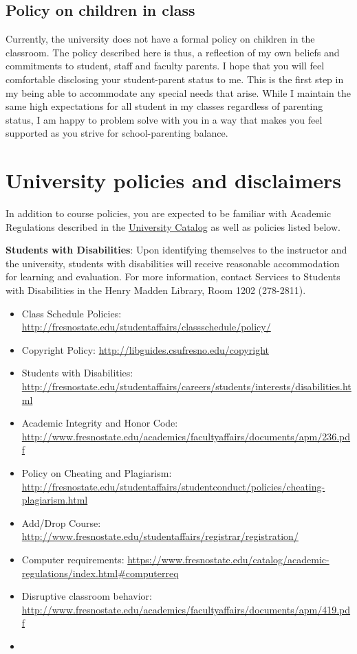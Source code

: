 \hypertarget{policy-on-children-in-class}{%
\subsection{Policy on children in
class}\label{policy-on-children-in-class}}

Currently, the university does not have a formal policy on children in
the classroom. The policy described here is thus, a reflection of my own
beliefs and commitments to student, staff and faculty parents. I hope
that you will feel comfortable disclosing your student-parent status to
me. This is the first step in my being able to accommodate any special
needs that arise. While I maintain the same high expectations for all
student in my classes regardless of parenting status, I am happy to
problem solve with you in a way that makes you feel supported as you
strive for school-parenting balance.

\hypertarget{university-policies-and-disclaimers}{%
\section{University policies and
disclaimers}\label{university-policies-and-disclaimers}}

In addition to course policies, you are expected to be familiar with
Academic Regulations described in the
\href{http://www.fresnostate.edu/catalog/academic-regulations/}{University
Catalog} as well as policies listed below.

\textbf{Students with Disabilities}: Upon identifying themselves to the
instructor and the university, students with disabilities will receive
reasonable accommodation for learning and evaluation. For more
information, contact Services to Students with Disabilities in the Henry
Madden Library, Room 1202 (278-2811).

\begin{itemize}
\item
  Class Schedule Policies:
  \url{http://fresnostate.edu/studentaffairs/classschedule/policy/}
\item
  Copyright Policy: \url{http://libguides.csufresno.edu/copyright}
\item
  Students with Disabilities:
  \url{http://fresnostate.edu/studentaffairs/careers/students/interests/disabilities.html}
\item
  Academic Integrity and Honor Code:
  \url{http://www.fresnostate.edu/academics/facultyaffairs/documents/apm/236.pdf}
\item
  Policy on Cheating and Plagiarism:
  \url{http://fresnostate.edu/studentaffairs/studentconduct/policies/cheating-plagiarism.html}
\item
  Add/Drop Course:
  \url{http://www.fresnostate.edu/studentaffairs/registrar/registration/}
\item
  Computer requirements:
  \url{https://www.fresnostate.edu/catalog/academic-regulations/index.html\#computerreq}
\item
  Disruptive classroom behavior:
  \url{http://www.fresnostate.edu/academics/facultyaffairs/documents/apm/419.pdf}
\item
\end{itemize}

